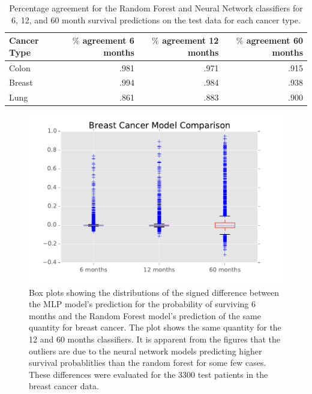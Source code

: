 \documentclass[a4paper,11pt]{article}
\begin{document}
\begin{table}[tbp]
\begin{center}
\begin{tabular}{lrrr}
\toprule
Cancer Type & $\%$ agreement 6 months & $\%$ agreement 12 months & $\%$ agreement 60 months \\ 
\midrule
Colon & .981 & .971 & .915 \\  
Breast & .994 & .984 & .938 \\  
Lung & .861 & .883 & .900 \\  
\bottomrule
\end{tabular}
\caption{\label{tab:agree} Percentage agreement for the Random Forest and Neural Network classifiers for 6, 12, and 60 month survival predictions on the test data for each cancer type.}
\end{center}
\end{table}

\begin{figure}[tbp]
\centering 
\begin{center}
\includegraphics[width=.70\textwidth,origin=c]{breastbox.pdf}
\caption{\label{fig:breastbox} Box plots showing the distributions of the signed difference between the MLP model's prediction for the probability of surviving 6 months and the Random Forest model's prediction of the same quantity for breast cancer. The plot shows the same quantity for the 12 and 60 months classifiers. It is apparent from the figures that the outliers are due to the neural network models predicting higher survival probablitlies than the random forest for some few cases. These differences were evaluated for the 3300 test patients in the breast cancer data.}
\end{center}
\end{figure}
\end{document}
